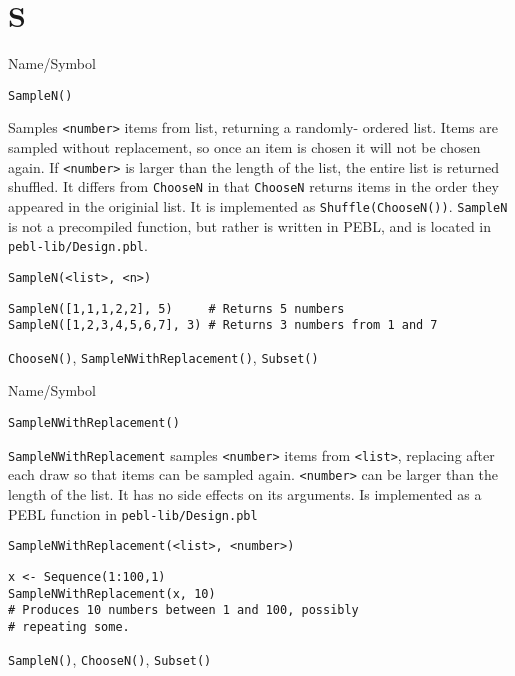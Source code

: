 \section{S}
\rl

\begin{desc}{Name/Symbol}
\item[Name/Symbol]  	\verb+SampleN()+

\item[Description] Samples \verb+<number>+ items from list, returning
  a randomly- ordered list. Items are sampled without replacement, so
  once an item is chosen it will not be chosen again. If
  \verb+<number>+ is larger than the length of the list, the entire
  list is returned shuffled.  It differs from \verb+ChooseN+ in that
  \verb+ChooseN+ returns items in the order they appeared in the
  originial list.  It is implemented as \verb+Shuffle(ChooseN())+.
  \verb+SampleN+ is not a precompiled function, but rather is written
  in PEBL, and is located in \verb+pebl-lib/Design.pbl+.

\item[Usage]       	
\begin{verbatim}
SampleN(<list>, <n>)
\end{verbatim}

\item[Example]   	
\begin{verbatim}
SampleN([1,1,1,2,2], 5)     # Returns 5 numbers
SampleN([1,2,3,4,5,6,7], 3) # Returns 3 numbers from 1 and 7
\end{verbatim}

\item[See Also]    	\verb+ChooseN()+, \verb+SampleNWithReplacement()+, \verb+Subset()+
\end{desc}

\rl


\begin{desc}{Name/Symbol}
\item[Name/Symbol] 	\verb+SampleNWithReplacement()+

\item[Description] \verb+SampleNWithReplacement+ samples
  \verb+<number>+ items from \verb+<list>+, replacing after each draw
  so that items can be sampled again.  \verb+<number>+ can be larger
  than the length of the list. It has no side effects on its
  arguments.  Is implemented as a PEBL function in
  \verb+pebl-lib/Design.pbl+

\item[Usage]        	
\begin{verbatim}
SampleNWithReplacement(<list>, <number>)
\end{verbatim}

\item[Example] 	
\begin{verbatim}
x <- Sequence(1:100,1)
SampleNWithReplacement(x, 10)
# Produces 10 numbers between 1 and 100, possibly 
# repeating some.
\end{verbatim}

\item[See Also]     	\verb+SampleN()+, \verb+ChooseN()+, \verb+Subset()+
\end{desc}

